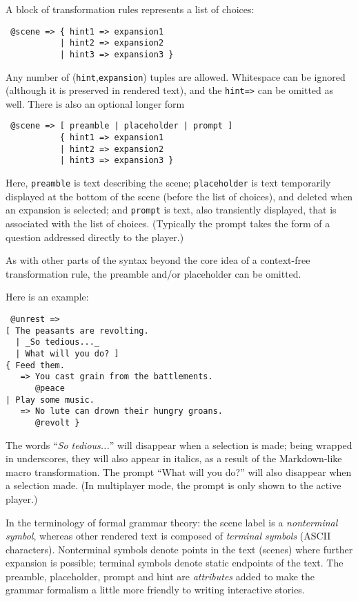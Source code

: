 \documentclass{acm_proc_article-sp}
\begin{document}
A block of transformation rules represents a list of choices:
\begin{verbatim}
 @scene => { hint1 => expansion1
           | hint2 => expansion2
           | hint3 => expansion3 }
\end{verbatim}
Any number of ({\tt hint},{\tt expansion}) tuples are allowed.
Whitespace can be ignored (although it is preserved in rendered text),
and the {\tt hint=>} can be omitted as well.
There is also an optional longer form
\begin{verbatim}
 @scene => [ preamble | placeholder | prompt ]
           { hint1 => expansion1
           | hint2 => expansion2
           | hint3 => expansion3 }
\end{verbatim}

Here, {\tt preamble} is text describing the scene;
{\tt placeholder} is text temporarily displayed at the bottom of the scene (before the list of choices),
and deleted when an expansion is selected;
and {\tt prompt} is text, also transiently displayed, that is associated with the list of choices.
(Typically the prompt takes the form of a question addressed directly to the player.)

As with other parts of the syntax beyond the core idea of a context-free transformation rule,
the preamble and/or placeholder can be omitted.

Here is an example:
\begin{verbatim}
 @unrest =>
[ The peasants are revolting. 
  | _So tedious..._ 
  | What will you do? ] 
{ Feed them.
   => You cast grain from the battlements.
      @peace
| Play some music.
   => No lute can drown their hungry groans.
      @revolt }
\end{verbatim}

The words ``{\em So tedious...}'' will disappear when a selection is made; being wrapped in underscores, they will also appear in italics, as a result of the Markdown-like macro transformation.
The prompt ``What will you do?'' will also disappear when a selection made.
(In multiplayer mode, the prompt is only shown to the active player.)



In the terminology of formal grammar theory: the scene label {\tt \@scene} is a {\em nonterminal symbol},
whereas other rendered text is composed of {\em terminal symbols} (ASCII characters).
Nonterminal symbols denote points in the text (scenes) where further expansion is possible;
terminal symbols denote static endpoints of the text.
The preamble, placeholder, prompt and hint are {\em attributes}
added to make the grammar formalism a little more friendly to writing interactive stories.
\end{document}
